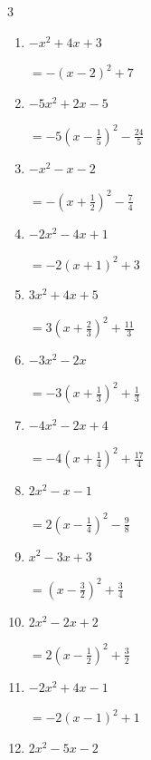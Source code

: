 \begin{multicols}{3}
\begin{enumerate}
        $\displaystyle =-3\left( x+\frac{1}{6}\right)^{2}-\frac{59}{12}$

  \item $-x^{2}+4x+3$

        $\displaystyle =-\left( x-2\right)^{2}+7$

  \item $-5x^{2}+2x-5$

        $\displaystyle =-5\left( x-\frac{1}{5}\right)^{2}-\frac{24}{5}$

  \item $-x^{2}-x-2$

        $\displaystyle =-\left( x+\frac{1}{2}\right)^{2}-\frac{7}{4}$

\columnbreak %

\resetques

  \item $-2x^{2}-4x+1$

        $\displaystyle =-2\left( x+1\right)^{2}+3$

  \item $3x^{2}+4x+5$

        $\displaystyle =3\left( x+\frac{2}{3}\right)^{2}+\frac{11}{3}$

  \item $-3x^{2}-2x$

        $\displaystyle =-3\left( x+\frac{1}{3}\right)^{2}+\frac{1}{3}$

  \item $-4x^{2}-2x+4$

        $\displaystyle =-4\left( x+\frac{1}{4}\right)^{2}+\frac{17}{4}$

  \item $2x^{2}-x-1$

        $\displaystyle =2\left( x-\frac{1}{4}\right)^{2}-\frac{9}{8}$

\columnbreak %

  \item $x^{2}-3x+3$

        $\displaystyle =\left( x-\frac{3}{2}\right)^{2}+\frac{3}{4}$

  \item $2x^{2}-2x+2$

        $\displaystyle =2\left( x-\frac{1}{2}\right)^{2}+\frac{3}{2}$

  \item $-2x^{2}+4x-1$

        $\displaystyle =-2\left( x-1\right)^{2}+1$

  \item $2x^{2}-5x-2$


\end{enumerate}
\end{multicols}
